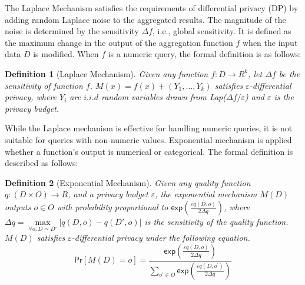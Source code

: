 \documentclass[conference]{IEEEtran}
\theoremstyle{plain}
\newtheorem{definition}{Definition}
\begin{document}
The Laplace Mechanism \cite{dwork2006calibrating} satisfies the requirements of differential privacy (DP) by adding random Laplace noise to the aggregated results. 
The magnitude of the noise is determined by the sensitivity $\Delta f$, i.e., global sensitivity.
It is defined as the maximum change in the output of the aggregation function $f$ when the input data $D$ is modified.
When $f$ is a numeric query, the formal definition is as follows:

\begin{definition}[Laplace Mechanism]
	\label{def:laplace}
Given any function $f: D \rightarrow R^k$,
let $\Delta f$ be the sensitivity of function $f$.
$M(x)=f(x)+(Y_1,...,Y_k)$ satisfies $\varepsilon$-differential privacy, where $Y_i$ are $i.i.d$ random variables drawn from Lap($\Delta f/\varepsilon$) and $\varepsilon$ is the privacy budget.
\end{definition}

While the Laplace mechanism is effective for handling numeric queries, it is not suitable for queries with non-numeric values. 
Exponential mechanism \cite{mcsherry2007mechanism} is applied whether a function’s output is numerical or categorical.
The formal definition is described as follows:

\begin{definition}[Exponential Mechanism]
    Given any quality function $q: (D \times O) \rightarrow R$, and a privacy budget $\varepsilon$, the exponential mechanism $M(D)$  outputs $o \in O$ with probability proportional to $\mathsf{exp}(\frac{\varepsilon q(D,o)}{2\Delta q})$, where $\Delta q = \max\limits_{\forall o, D \simeq D'} |q(D, o) - q(D', o)|$ is the sensitivity of the quality function.
    $M(D)$ satisfies $\varepsilon$-differential privacy under the following equation.
    \begin{equation}
        \mathsf{Pr}[M(D)=o]=\frac{\mathsf{exp}(\frac{\varepsilon q(D,o)}{2\Delta q})}{\sum_{o^\prime\in O}\mathsf{exp}(\frac{\varepsilon q(D,o^\prime)}{2\Delta q})}
    \end{equation}
\end{definition}
\end{document}
